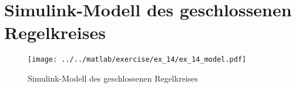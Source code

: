 \section{Simulink-Modell des geschlossenen Regelkreises}

\begin{figure}[h!]
	\centering
	\texttt{[image: ../../matlab/exercise/ex\_14/ex\_14\_model.pdf]}
	\caption{Simulink-Modell des geschlossenen Regelkreises}
\end{figure}
